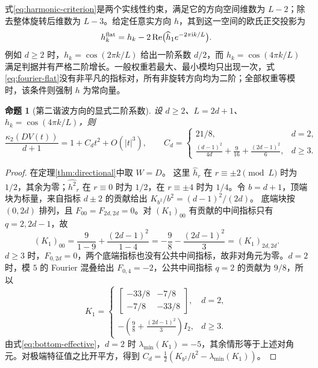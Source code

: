 \documentclass[UTF8,a4paper,zihao=-4,fontset=windows]{ctexart}
\theoremstyle{chinese}
\newtheorem{proposition}[theorem]{命题}
\numberwithin{equation}{section}
\newcommand{\cond}{\kappa_2}
\begin{document}
式\eqref{eq:harmonic-criterion}是两个实线性约束，满足它的方向空间维数为 $L-2$；除去整体旋转后维数为 $L-3$。给定任意实方向 $h$，其到这一空间的欧氏正交投影为
\begin{equation}\label{eq:harmonic-projection}
h_k^{\rm flat}=h_k-2\operatorname{Re}\bigl(\widehat h_1e^{-2\pi\mathrm i k/L}\bigr).
\end{equation}
例如 $d\ge2$ 时，$h_k=\cos(2\pi k/L)$ 给出一阶系数 $d/2$，而 $h_k=\cos(4\pi k/L)$ 满足判据并有严格二阶增长。一般权重若最大、最小模均只出现一次，式\eqref{eq:fourier-flat}没有非平凡的指标对，所有非旋转方向均为二阶；全部权重等模时，该条件则强制 $h$ 为常向量。

\begin{proposition}[第二谐波方向的显式二阶系数]\label{prop:second-harmonic}
设 $d\ge2$、$L=2d+1$、$h_k=\cos(4\pi k/L)$，则
\begin{equation}\label{eq:second-harmonic}
\frac{\cond(DV(t))}{d+1}=1+C_dt^2+O(|t|^3),\qquad
C_d=\begin{cases}
21/8,&d=2,\\
\displaystyle\frac{(d-1)^2}{4d}+\frac9{16}+\frac{(2d-1)^2}{6},&d\ge3.
\end{cases}
\end{equation}
\end{proposition}
\begin{proof}
在定理\ref{thm:directional}中取 $W=D$。
这里 $\widehat h_r$ 在 $r\equiv\pm2\pmod L$ 时为 $1/2$，其余为零；$\widehat{h^2}_r$ 在 $r\equiv0$ 时为 $1/2$，在 $r\equiv\pm4$ 时为 $1/4$。令 $b=d+1$，顶端块为标量，来自指标 $d\pm2$ 的贡献给出 $K_{b^2}/b^2=(d-1)^2/(2d)$。
底端块按 $(0,2d)$ 排列，且 $F_{00}=F_{2d,2d}=0$。对 $(K_1)_{00}$ 有贡献的中间指标只有 $q=2,2d-1$，故
\[
(K_1)_{00}=\frac{9}{1-9}+\frac{(2d-1)^2}{1-4}
=-\frac98-\frac{(2d-1)^2}{3}=(K_1)_{2d,2d}.
\]
$d\ge3$ 时，$F_{0,2d}=0$，两个底端指标也没有公共中间指标，故非对角元为零。$d=2$ 时，模 $5$ 的 Fourier 混叠给出 $F_{0,4}=-2$，公共中间指标 $q=2$ 的贡献为 $9/8$，所以
\begin{equation}\label{eq:bottom-effective}
K_1=\begin{cases}
\begin{bmatrix}-33/8&-7/8\\-7/8&-33/8\end{bmatrix},&d=2,\\[6pt]
-\left(\displaystyle\frac98+\frac{(2d-1)^2}{3}\right)I_2,&d\ge3.
\end{cases}
\end{equation}
由式\eqref{eq:bottom-effective}，$d=2$ 时 $\lambda_{\min}(K_1)=-5$，其余情形等于上述对角元。对极端特征值之比开平方，得到 $C_d=\tfrac12(K_{b^2}/b^2-\lambda_{\min}(K_1))$。
\end{proof}
\end{document}
